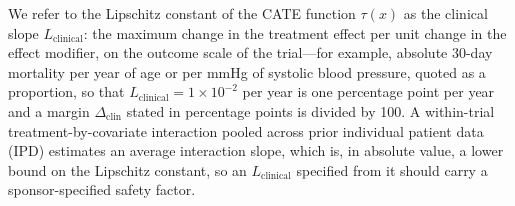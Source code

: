 \documentclass[AMA,Times1COL]{WileyNJDv5}
\begin{document}
We refer to the Lipschitz constant of the CATE function $\tau(x)$ as the clinical slope $L_{\text{clinical}}$: the maximum change in the treatment effect per unit change in the effect modifier, on the outcome scale of the trial---for example, absolute 30-day mortality per year of age or per mmHg of systolic blood pressure, quoted as a proportion, so that $L_{\text{clinical}} = 1 \times 10^{-2}$ per year is one percentage point per year and a margin $\Delta_{\text{clin}}$ stated in percentage points is divided by 100. A within-trial treatment-by-covariate interaction pooled across prior individual patient data (IPD)\cite{riley2010,fisher2017} estimates an average interaction slope, which is, in absolute value, a lower bound on the Lipschitz constant, so an $L_{\text{clinical}}$ specified from it should carry a sponsor-specified safety factor.
\end{document}
